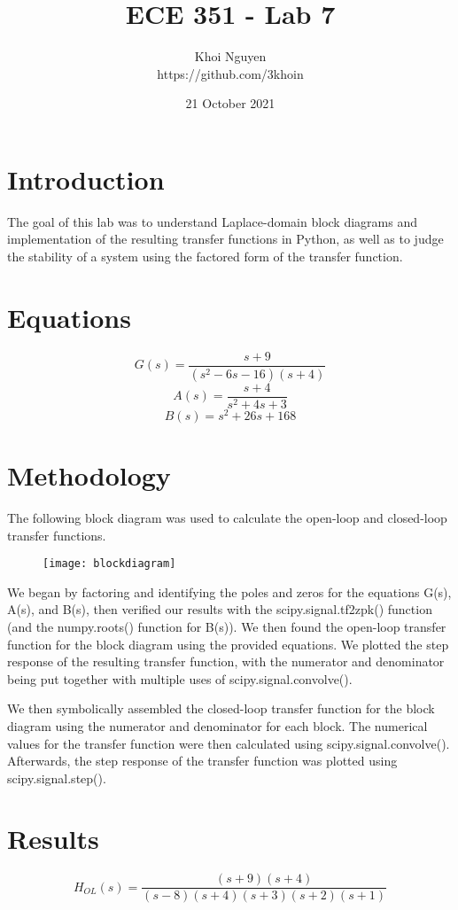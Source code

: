 \documentclass[11pt,a4,titlepage]{article}
\title{ECE 351 - Lab 7}
\author{Khoi Nguyen \\ https://github.com/3khoin}
\date{21 October 2021}
\begin{document}
\maketitle
\pagebreak

\tableofcontents
\pagebreak

\section{Introduction}
The goal of this lab was to understand Laplace-domain block diagrams and implementation of the resulting transfer functions in Python, as well as to judge the stability of a system using the factored form of the transfer function.

\section{Equations}
\[G(s) = \frac{s+9}{(s^{2} - 6s - 16)(s + 4)}\]
\[A(s) = \frac{s+4}{s^{2} + 4s + 3}\]
\[B(s) = s^{2} + 26s + 168\]

\section{Methodology}
The following block diagram was used to calculate the open-loop and closed-loop transfer functions.
\begin{figure}[H]
\centering
\texttt{[image: blockdiagram]}
\end{figure}

We began by factoring and identifying the poles and zeros for the equations G(s), A(s), and B(s), then verified our results with the scipy.signal.tf2zpk() function (and the numpy.roots() function for B(s)). We then found the open-loop transfer function for the block diagram using the provided equations. We plotted the step response of the resulting transfer function, with the numerator and denominator being put together with multiple uses of scipy.signal.convolve().

We then symbolically assembled the closed-loop transfer function for the block diagram using the numerator and denominator for each block. The numerical values for the transfer function were then calculated using scipy.signal.convolve(). Afterwards, the step response of the transfer function was plotted using scipy.signal.step().

\section{Results}
\[H_{OL}(s) = \frac{(s+9)(s+4)}{(s-8)(s+4)(s+3)(s+2)(s+1)}\]
\end{document}
